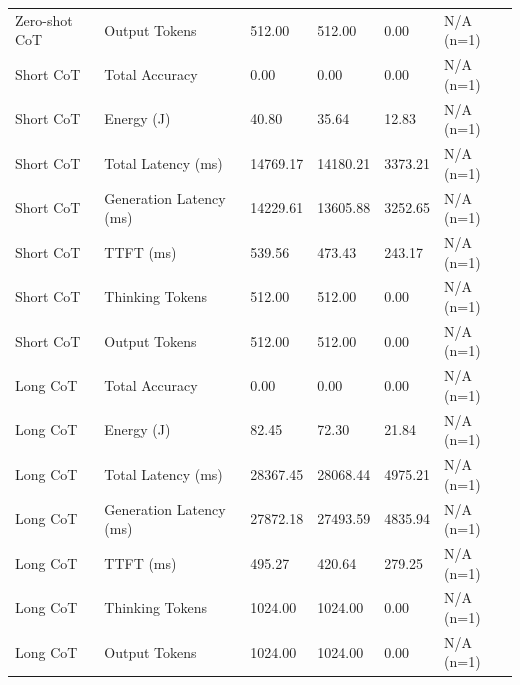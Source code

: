 \begin{table}
\begin{tabular}{llllll}
Zero-shot CoT & Output Tokens & 512.00 & 512.00 & 0.00 & N/A (n=1) \\
Short CoT & Total Accuracy & 0.00 & 0.00 & 0.00 & N/A (n=1) \\
Short CoT & Energy (J) & 40.80 & 35.64 & 12.83 & N/A (n=1) \\
Short CoT & Total Latency (ms) & 14769.17 & 14180.21 & 3373.21 & N/A (n=1) \\
Short CoT & Generation Latency (ms) & 14229.61 & 13605.88 & 3252.65 & N/A (n=1) \\
Short CoT & TTFT (ms) & 539.56 & 473.43 & 243.17 & N/A (n=1) \\
Short CoT & Thinking Tokens & 512.00 & 512.00 & 0.00 & N/A (n=1) \\
Short CoT & Output Tokens & 512.00 & 512.00 & 0.00 & N/A (n=1) \\
Long CoT & Total Accuracy & 0.00 & 0.00 & 0.00 & N/A (n=1) \\
Long CoT & Energy (J) & 82.45 & 72.30 & 21.84 & N/A (n=1) \\
Long CoT & Total Latency (ms) & 28367.45 & 28068.44 & 4975.21 & N/A (n=1) \\
Long CoT & Generation Latency (ms) & 27872.18 & 27493.59 & 4835.94 & N/A (n=1) \\
Long CoT & TTFT (ms) & 495.27 & 420.64 & 279.25 & N/A (n=1) \\
Long CoT & Thinking Tokens & 1024.00 & 1024.00 & 0.00 & N/A (n=1) \\
Long CoT & Output Tokens & 1024.00 & 1024.00 & 0.00 & N/A (n=1) \\
\bottomrule
\end{tabular}
\end{table}
